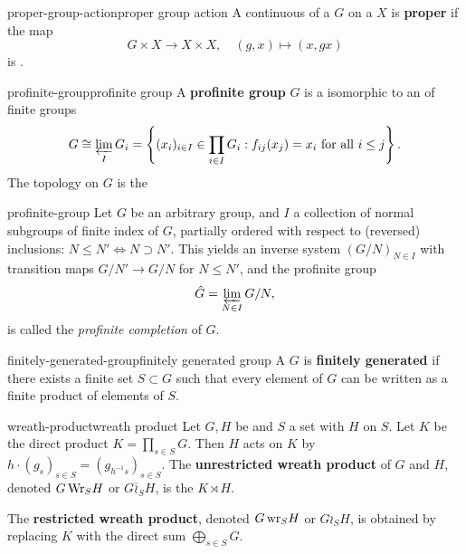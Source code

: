 \begin{topic}{proper-group-action}{proper group action}
    A continuous  of a  $G$ on a  $X$ is \textbf{proper} if the map
    \[ G \times X \to X \times X, \quad (g, x) \mapsto (x, gx) \]
    is .
\end{topic}

\begin{topic}{profinite-group}{profinite group}
    A \textbf{profinite group} $G$ is a  isomorphic to an  of  finite groups
    \[ G \cong \varprojlim_I G_i = \left\{ (x_i)_{i \in I} \in \prod_{i \in I} G_i : f_{ij}(x_j) = x_i \text{ for all } i \le j \right\} . \]
    The topology on $G$ is the  
\end{topic}

\begin{example}{profinite-group}
    Let $G$ be an arbitrary group, and $I$ a collection of normal subgroups of finite index of $G$, partially ordered with respect to (reversed) inclusions: $N \le N' \iff N \supset N'$. This yields an inverse system $(G / N)_{N \in I}$ with transition maps $G/N' \to G/N$ for $N \le N'$, and the profinite group
    \[ \hat{G} = \varprojlim_{N \in I} G / N ,\]
    is called the \textit{profinite completion} of $G$.
\end{example}

\begin{topic}{finitely-generated-group}{finitely generated group}
    A  $G$ is \textbf{finitely generated} if there exists a finite set $S \subset G$ such that every element of $G$ can be written as a finite product of elements of $S$.
\end{topic}

\begin{topic}{wreath-product}{wreath product}
    Let $G, H$ be  and $S$ a set with $H$  on $S$. Let $K$ be the direct product $K = \prod_{s \in S} G$. Then $H$ acts on $K$ by $h \cdot (g_s)_{s \in S} = (g_{h^{-1} s})_{s \in S}$. The \textbf{unrestricted wreath product} of $G$ and $H$, denoted $G \, \textup{Wr}_S H$ or $G \overline{\wr}_S H$, is the  $K \rtimes H$.
    
    The \textbf{restricted wreath product}, denoted $G \, \textup{wr}_S H$ or $G \wr_S H$, is obtained by replacing $K$ with the direct sum $\bigoplus_{s \in S} G$.
\end{topic}

